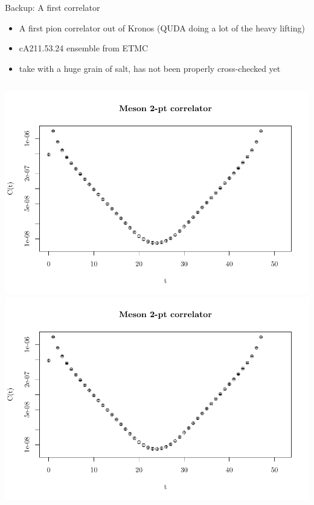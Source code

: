 \begin{frame}{Backup: A first correlator}

  \begin{itemize}
    \item A first pion correlator out of Kronos (QUDA doing a lot of the heavy lifting)
    \item cA211.53.24 ensemble from ETMC
    \item take with a huge grain of salt, has not been properly cross-checked yet
  \end{itemize}
  \begin{columns}
      \includegraphics[width=\textwidth,page=1]{figs/meson_2pt_analyze_cA211.53.24_mu_0.0053_gam_G5.pdf}
      \includegraphics[width=\textwidth,page=2]{figs/meson_2pt_analyze_cA211.53.24_mu_0.0053_gam_G5.pdf}
  \end{columns}
\end{frame}


